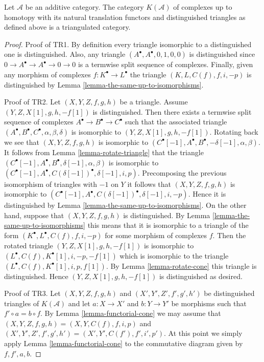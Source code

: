 \begin{proposition}
\label{proposition-homotopy-category-triangulated}
Let $\mathcal{A}$ be an additive category.
The category $K(\mathcal{A})$ of complexes up to
homotopy with its natural translation functors
and distinguished triangles as defined above
is a triangulated category.
\end{proposition}

\begin{proof}
Proof of TR1. By definition every triangle isomorphic to a distinguished
one is distinguished. Also, any triangle $(A^\bullet, A^\bullet, 0, 1, 0, 0)$
is distinguished since $0 \to A^\bullet \to A^\bullet \to 0 \to 0$ is
a termwise split sequence of complexes. Finally, given any morphism of
complexes $f : K^\bullet \to L^\bullet$ the triangle
$(K, L, C(f), f, i, -p)$ is distinguished by
Lemma \ref{lemma-the-same-up-to-isomorphisms}.

\medskip\noindent
Proof of TR2. Let $(X, Y, Z, f, g, h)$ be a triangle.
Assume $(Y, Z, X[1], g, h, -f[1])$ is distinguished.
Then there exists a termwise split sequence of complexes
$A^\bullet \to B^\bullet \to C^\bullet$ such that the associated
triangle $(A^\bullet, B^\bullet, C^\bullet, \alpha, \beta, \delta)$
is isomorphic to $(Y, Z, X[1], g, h, -f[1])$. Rotating back we see
that $(X, Y, Z, f, g, h)$ is isomorphic to
$(C^\bullet[-1], A^\bullet, B^\bullet, -\delta[-1], \alpha, \beta)$.
It follows from Lemma \ref{lemma-rotate-triangle} that the triangle
$(C^\bullet[-1], A^\bullet, B^\bullet, \delta[-1], \alpha, \beta)$
is isomorphic to
$(C^\bullet[-1], A^\bullet, C(\delta[-1])^\bullet, \delta[-1], i, p)$.
Precomposing the previous isomorphism of triangles with $-1$ on $Y$
it follows that $(X, Y, Z, f, g, h)$ is isomorphic to
$(C^\bullet[-1], A^\bullet, C(\delta[-1])^\bullet, \delta[-1], i, -p)$.
Hence it is distinguished by
Lemma \ref{lemma-the-same-up-to-isomorphisms}.
On the other hand, suppose that $(X, Y, Z, f, g, h)$ is distinguished.
By Lemma \ref{lemma-the-same-up-to-isomorphisms} this means that it is
isomorphic to a triangle of the form
$(K^\bullet, L^\bullet, C(f), f, i, -p)$ for some morphism of
complexes $f$. Then the rotated triangle $(Y, Z, X[1], g, h, -f[1])$ is
isomorphic to $(L^\bullet, C(f), K^\bullet[1], i, -p, -f[1])$ which is
isomorphic to the triangle $(L^\bullet, C(f), K^\bullet[1], i, p, f[1])$.
By Lemma \ref{lemma-rotate-cone} this triangle is distinguished.
Hence $(Y, Z, X[1], g, h, -f[1])$ is distinguished as desired.

\medskip\noindent
Proof of TR3. Let
$(X, Y, Z, f, g, h)$ and $(X', Y', Z', f', g', h')$
be distinguished triangles of $K(\mathcal{A})$
and let $a : X \to X'$ and $b : Y \to Y'$ be morphisms
such that $f' \circ a = b \circ f$. By Lemma \ref{lemma-functorial-cone}
we may assume that
$(X, Y, Z, f, g, h) = (X, Y, C(f), f, i, p)$ and
$(X', Y', Z', f', g', h') = (X', Y', C(f'), f', i', p')$.
At this point we simply apply Lemma \ref{lemma-functorial-cone}
to the commutative diagram given by $f, f', a, b$.


\end{proof}
